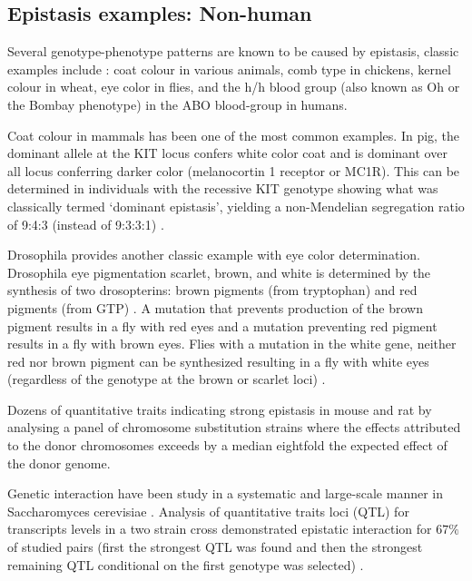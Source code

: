 \subsection{Epistasis examples: Non-human}

Several genotype-phenotype patterns are known to be caused by epistasis, classic examples include \cite{carlborg2004epistasis}:
coat colour in various animals, 
comb type in chickens, 
kernel colour in wheat,
eye color in flies,
and the h/h blood group (also known as Oh or the Bombay phenotype) in the ABO blood-group in humans.

Coat colour in mammals has been one of the most common examples. 
In pig, the dominant allele at the KIT locus confers white color coat and is dominant over all locus conferring darker color (melanocortin 1 receptor or MC1R). 
This can be determined in individuals with the recessive KIT genotype showing what was classically termed `dominant epistasis', 
yielding a non-Mendelian segregation ratio of 9:4:3 (instead of 9:3:3:1) \cite{carlborg2004epistasis, phillips2008epistasis}.

Drosophila provides another classic example with eye color determination.
Drosophila eye pigmentation scarlet, brown, and white is determined by the synthesis of two drosopterins:  brown pigments (from tryptophan) and red pigments (from GTP) \cite{tyler2009shadows:REF}.
A mutation that prevents production of the brown pigment results in a fly with red eyes and a mutation preventing red pigment results in a fly with brown eyes.
Flies with a mutation in the white gene, neither red nor brown pigment can be synthesized resulting in a fly with white eyes (regardless of the genotype at the brown or scarlet loci) \cite{tyler2009shadows}.

Dozens of quantitative traits indicating strong epistasis in mouse and rat \cite{zuk2012mystery:REF22} by analysing a panel of chromosome substitution strains where the effects attributed to the donor chromosomes exceeds by a median eightfold the expected effect of the donor genome.

Genetic interaction have been study in a systematic and large-scale manner in Saccharomyces cerevisiae \cite{mani2008defining:REF}.
Analysis of quantitative traits loci (QTL) for transcripts levels in a two strain cross demonstrated epistatic interaction for $67\%$ of studied pairs (first the strongest QTL was found and then the strongest remaining QTL conditional on the first genotype was selected) \cite{zuk2012mystery:REF}. 

